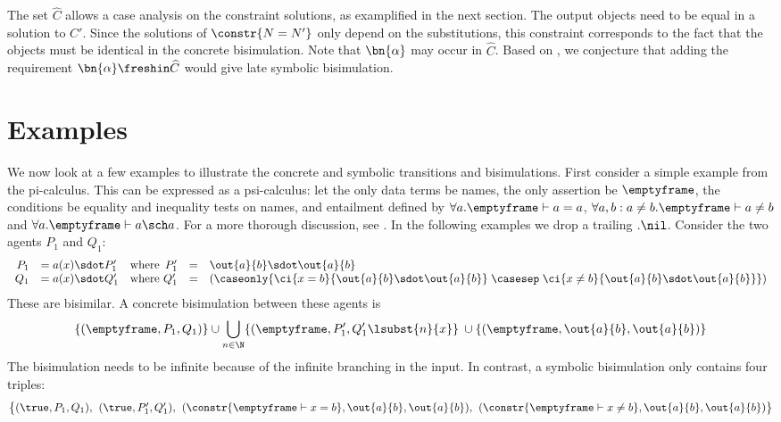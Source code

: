 \documentclass{eptcs}
\theoremstyle{definition}
\begin{document}
The set $\widehat{C}$ allows a case analysis on the constraint solutions, as examplified in the next section. 
The output objects need to be equal in a solution to $C'$. Since
the solutions of  $\constr{N=N'}$ only depend on the substitutions, this constraint corresponds to the fact that the objects must be identical in the concrete bisimulation.
Note that $\bn{\alpha}$ may occur in $\widehat{C}$. Based on
\cite{boreale.de-nicola:symbolic-semantics,lin:symbolic-transition}, we
conjecture that adding the requirement
$\bn{\alpha} \freshin \widehat{C}$ would give late symbolic bisimulation.

\section{Examples}
\label{sec:examples}
We now look at a few examples to illustrate the concrete and
symbolic transitions and bisimulations. First consider a simple example from the pi-calculus.
This can be expressed as a psi-calculus: let the only data terms be
names,  the only
assertion be $\emptyframe$, the conditions be equality and inequality tests on
names, and entailment defined by $\forall a.\emptyframe\vdash a=a$, $\forall a,b:a\neq b.\emptyframe\vdash a\neq b$ and $\forall
a.\emptyframe\vdash a\sch a$. For a more thorough discussion,
see \cite{bengtson.johansson.ea:psi-calculi}. In the following examples we drop a trailing $.\nil$.
Consider the two agents $P_1$ and $Q_1$:
\[
\begin{array}{rl@{\quad\text{where }}rcl}
 P_1 &= a(x)\sdot P_1' & P_1'&=&\out{a}{b}\sdot \out{a}{b}\\
 Q_1 &= a(x)\sdot Q_1' &
Q_1'&=&(\caseonly{\ci{x=b}{\out{a}{b}\sdot \out{a}{b}}\;\casesep\;\ci{x\neq
b}{\out{a}{b} \sdot \out{a}{b}}})
\end{array}
\]
These are bisimilar. A concrete bisimulation between these agents is
\[
 \{ (\emptyframe,P_1,Q_1) \} \cup \bigcup_{n \in \N} \{ (\emptyframe,
P_1', Q_1'\lsubst{n}{x} \}\: \cup \{ (\emptyframe,\out{a}{b},\out{a}{b}) \}
\]
The bisimulation needs to be infinite because of the infinite branching in the input.
In contrast, a
symbolic bisimulation only contains four triples:
\[
\left\{
\begin{array}{@{}c@{\;\;}c@{\;\;}c@{\;\;}c@{}}
(\true,P_1,Q_1), & (\true, P_1', Q_1'), &
(\constr{\emptyframe \vdash x=b},\out{a}{b},\out{a}{b}), & (\constr{\emptyframe \vdash x\neq b},\out{a}{b},\out{a}{b})\\
\end{array}
\right\}
\]
\end{document}
